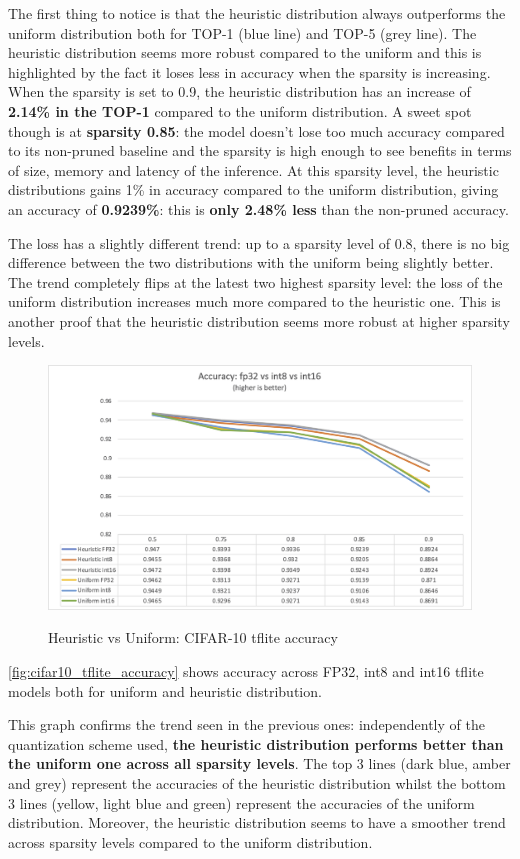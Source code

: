 The first thing to notice is that the heuristic distribution always outperforms
the uniform distribution both for TOP-1 (blue line) and TOP-5 (grey line).
The heuristic distribution seems more robust compared to the uniform and this
is highlighted by the fact it loses less in accuracy when the sparsity is
increasing.
When the sparsity is set to 0.9, the heuristic distribution has an increase of
\textbf{2.14\% in the TOP-1} compared to the uniform distribution.
A sweet spot though is at \textbf{sparsity 0.85}: the model doesn't lose too
much accuracy compared to its non-pruned baseline and the sparsity is high
enough to see benefits in terms of size, memory and latency of the inference.
At this sparsity level, the heuristic distributions gains 1\% in accuracy
compared to the uniform distribution, giving an accuracy of \textbf{0.9239\%}:
this is \textbf{only 2.48\% less} than the non-pruned accuracy.

The loss has a slightly different trend: up to a sparsity level of 0.8, there
is no big difference between the two distributions with the uniform being
slightly better.
The trend completely flips at the latest two highest sparsity level: the loss
of the uniform distribution increases much more compared to the heuristic one.
This is another proof that the heuristic distribution seems more robust at
higher sparsity levels.

\begin{figure}[ht]
    \centering
    {\includegraphics[width=.8\linewidth]{images/experiments/cifar10_tflite_accuracy.png}}
    \caption{Heuristic vs Uniform: CIFAR-10 tflite accuracy}\label{fig:cifar10_tflite_accuracy}
\end{figure}

\autoref{fig:cifar10_tflite_accuracy} shows accuracy across FP32, int8 and
int16 tflite models both for uniform and heuristic distribution.

This graph confirms the trend seen in the previous ones: independently of the
quantization scheme used, \textbf{the heuristic distribution performs better
than the uniform one across all sparsity levels}.
The top 3 lines (dark blue, amber and grey) represent the accuracies of the
heuristic distribution whilst the bottom 3 lines (yellow, light blue and green)
represent the accuracies of the uniform distribution.
Moreover, the heuristic distribution seems to have a smoother trend across
sparsity levels compared to the uniform distribution.

